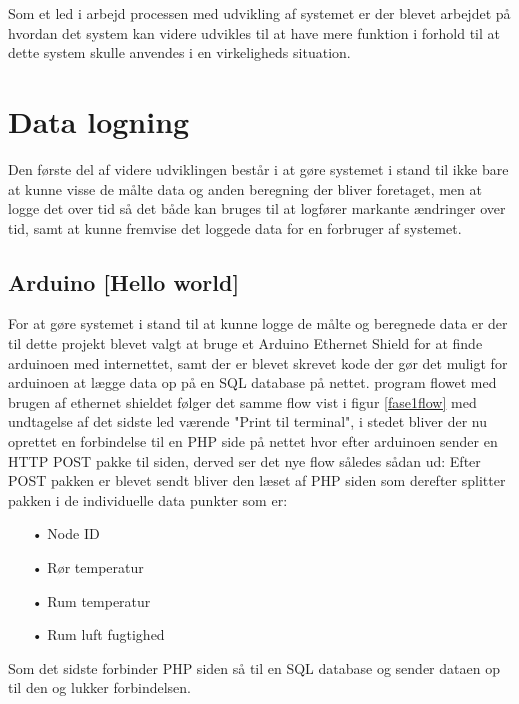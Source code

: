 Som et led i arbejd processen med udvikling af systemet er der blevet arbejdet på hvordan det system kan videre udvikles til at have mere funktion i forhold til at dette system skulle anvendes i en virkeligheds situation.

\section{Data logning}
Den første del af videre udviklingen består i at gøre systemet i stand til ikke bare at kunne visse de målte data og anden beregning der bliver foretaget, men at logge det over tid så det både kan bruges til at logfører markante ændringer over tid, samt at kunne fremvise det loggede data for en forbruger af systemet.

\subsection{Arduino [Hello world]}
For at gøre systemet i stand til at kunne logge de målte og beregnede data er der til dette projekt blevet valgt at bruge et Arduino Ethernet Shield for at finde arduinoen med internettet, samt der er blevet skrevet kode der gør det muligt for arduinoen at lægge data op på en SQL database på nettet.
\newline
program flowet med brugen af ethernet shieldet følger det samme flow vist i figur \ref{fase1flow}
med undtagelse af det sidste led værende "Print til terminal", i stedet bliver der nu oprettet en forbindelse til en PHP side på nettet hvor efter arduinoen sender en HTTP POST pakke til siden, derved ser det nye flow således sådan ud:
\newline
Efter POST pakken er blevet sendt bliver den læset af PHP siden som derefter splitter pakken i de individuelle data punkter som er:
\begin{enumerate}
	\item[•]Node ID
	\item[•]Rør temperatur
	\item[•]Rum temperatur
	\item[•]Rum luft fugtighed
\end{enumerate}
Som det sidste forbinder PHP siden så til en SQL database og sender dataen op til den og lukker forbindelsen.
